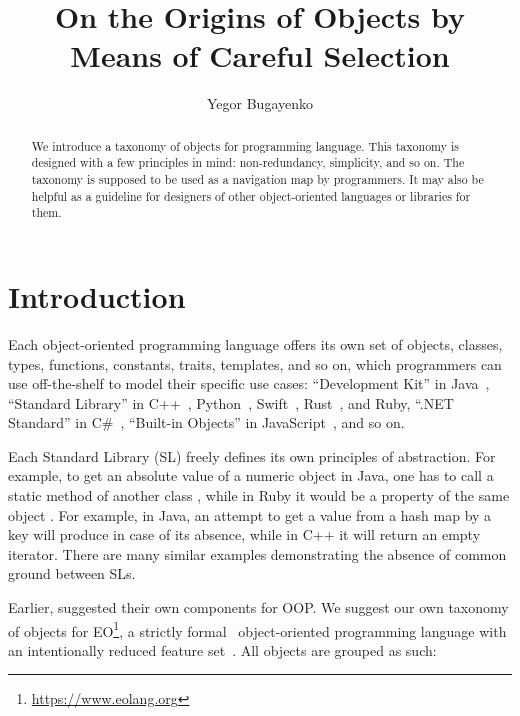 \documentclass[sigplan,nonacm]{acmart}
\title{On the Origins of Objects by Means of Careful Selection}
\author{Yegor Bugayenko}
\affiliation{
  \institution{Huawei}
  \country{Russia}
  \city{Moscow}
}
\begin{document}
\begin{abstract}
We introduce a taxonomy of objects for \eolang{} programming language.
This taxonomy is designed with a few principles in mind: non-redundancy,
simplicity, and so on. The taxonomy is supposed to be used as a navigation map
by \eolang{} programmers. It may also be helpful as a guideline for designers of
other object-oriented languages or libraries for them.
\end{abstract}

\maketitle

\section{Introduction}

Each object-oriented programming language offers its own set of objects, classes, types, functions, constants, traits, templates, and so on, which programmers can use off-the-shelf to model their specific use cases:
``Development Kit'' in Java~\citep{jdk2024,java2024},
``Standard Library'' in
  C++~\citep{cpp2024,cpp2012},
  Python~\citep{python2024,python2017},
  Swift~\citep{swift2024,swift2015},
  Rust~\citep{rust2024,rust2021},
  and
  Ruby,
``.NET Standard'' in C\#~\citep{net2023,net2005},
``Built-in Objects'' in JavaScript~\citep{js2024,js2008},
and so on.

Each Standard Library (SL) freely defines its own principles of abstraction. For
example, to get an absolute value of a numeric object  in Java, one has
to call a static method of another class , while in Ruby it
would be a property of the same object . For example, in Java, an
attempt to get a value from a hash map by a key will produce  in case
of its absence, while in C++ it will return an empty iterator. There are many
similar examples demonstrating the absence of common ground between SLs.

Earlier, \citet{booch1990design} suggested their own components for OOP. We
suggest our own taxonomy of objects for
EO\footnote{\url{https://www.eolang.org}},
a strictly formal~\citep{kudasov2021} object-oriented programming language with an intentionally
reduced feature set~\citep{bugayenko2021eolang}.
All objects are grouped as such:
\end{document}
